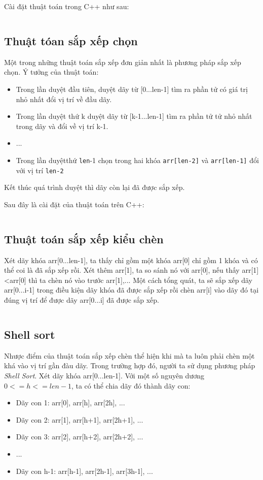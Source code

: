 \documentclass[a4paper]{article}
\newcommand{\mnt}[1]{\inputminted[frame=single, linenos=true, tabsize=4]{c++}{#1}}
\begin{document}
Cài đặt thuật toán trong C++ như sau:
\mnt{src/bublesort.cpp}

\subsection{Thuật tóan sắp xếp chọn}

Một trong những thuật toán sắp xếp đơn giản nhất là phương pháp sắp xếp chọn. Ý tưởng của thuật toán:
\begin{itemize}
\item Trong lần duyệt đầu tiên, duyệt dãy từ [0...len-1] tìm ra phần tử có giá trị nhỏ nhất đổi vị trí về đầu dãy.
\item Trong lần duyệt thứ k duyệt dãy từ [k-1...len-1] tìm ra phần tử tử nhỏ nhất trong dãy và đổi về vị trí k-1.
\item ...
\item Trong lần duyệtthứ \texttt{len}-1 chọn trong hai khóa \texttt{arr[len-2]} và \texttt{arr[len-1]} đổi với vị trí \texttt{len-2}
\end{itemize}

Kết thúc quá trình duyệt thì dãy còn lại đã được sắp xếp.

Sau đây là cài đặt của thuật toán trên C++:
\mnt{src/selectionsort.cpp}

\subsection{Thuật toán sắp xếp kiểu chèn}

Xét dãy khóa arr[0...len-1], ta thấy chỉ gồm một khóa arr[0] chỉ gồm 1 khóa và có thể coi là đã sắp xếp rồi. Xét thêm arr[1], ta so sánh nó với arr[0], nếu thấy arr[1]<arr[0] thì ta chèn nó vào trước arr[1],... Một cách tổng quát, ta sẽ sắp xếp dãy arr[0...i-1] trong điều kiện dãy khóa đã được sắp xếp rồi chèn arr[i] vào dãy đó tại đúng vị trí để được dãy arr[0...i] đã được sắp xếp.

\mnt{src/insertionsort.cpp}

\subsection{Shell sort}

Nhược điểm của thuật toán sắp xếp chèn thể hiện khi mà ta luôn phải chèn một khá vào vị trí gần đàu dãy. Trong trường hợp đó, người ta sử dụng phương pháp \emph{Shell Sort}. Xét dãy khóa arr[0...len-1]. Với một số nguyên dương $0 <= h <= len-1$, ta có thể chia dãy đó thành dãy con:
\begin{itemize}
\item Dãy con 1: arr[0], arr[h], arr[2h], ...
\item Dãy con 2: arr[1], arr[h+1], arr[2h+1], ...
\item Dãy con 3: arr[2], arr[h+2], arr[2h+2], ...
\item ...
\item Dãy con h-1: arr[h-1], arr[2h-1], arr[3h-1], ...
\end{itemize}
\end{document}
